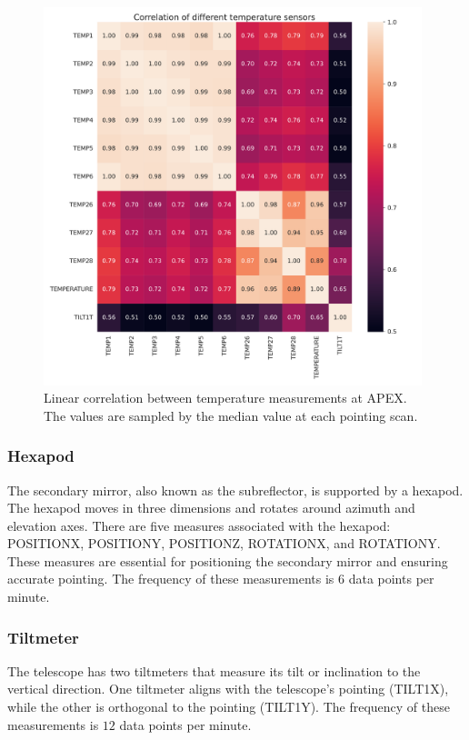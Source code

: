 \begin{figure}[H]
    \centering
    \includegraphics[width=0.98\textwidth]{Correlation/Correlation_temp.pdf}
    \caption[Correlation between temperature measurements]{Linear correlation between temperature measurements at APEX.
    The values are sampled by the median value at each pointing scan.}
    \label{fig:corr_temp}
\end{figure}

\subsubsection{Hexapod}
The secondary mirror, also known as the subreflector, is supported by a hexapod.
The hexapod moves in three dimensions and rotates around azimuth and elevation axes.
There are five measures associated with the hexapod: POSITIONX, POSITIONY, POSITIONZ, ROTATIONX, and ROTATIONY.
These measures are essential for positioning the secondary mirror and ensuring accurate pointing.
The frequency of these measurements is $6$ data points per minute.

\subsubsection{Tiltmeter}
The telescope has two tiltmeters that measure its tilt or inclination to the vertical direction.
One tiltmeter aligns with the telescope's pointing (TILT1X), while the other is orthogonal to the pointing (TILT1Y).
The frequency of these measurements is $12$ data points per minute.

